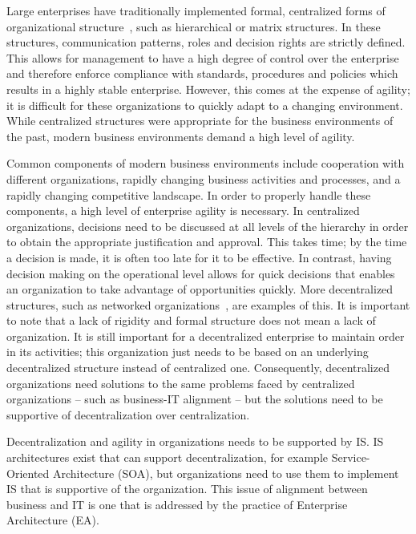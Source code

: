 Large enterprises have traditionally implemented formal, centralized forms of organizational structure~\cite{pearlson2009}, such as hierarchical or matrix structures. In these structures, communication patterns, roles and decision rights are strictly defined. This allows for management to have a high degree of control over the enterprise and therefore enforce compliance with standards, procedures and policies which results in a highly stable enterprise. However, this comes at the expense of agility; it is difficult for these organizations to quickly adapt to a changing environment. While centralized structures were appropriate for the business environments of the past, modern business environments demand a high level of agility.

Common components of modern business environments include cooperation with different organizations,  rapidly changing business activities and processes, and a rapidly changing competitive landscape. In order to properly handle these components, a high level of enterprise agility is necessary. In centralized organizations, decisions need to be discussed at all levels of the hierarchy in order to obtain the appropriate justification and approval. This takes time; by the time a decision is made, it is often too late for it to be effective. In contrast, having decision making on the operational level allows for quick decisions that enables an organization to take advantage of opportunities quickly. More decentralized structures, such as networked organizations~\cite{pearlson2009}, are examples of this. It is important to note that a lack of rigidity and formal structure does not mean a lack of organization. It is still important for a decentralized enterprise to maintain order in its activities; this organization just needs to be based on an underlying decentralized structure instead of centralized one. Consequently, decentralized organizations need solutions to the same problems faced by centralized organizations -- such as business-IT alignment -- but the solutions need to be supportive of decentralization over centralization. 

Decentralization and agility in organizations needs to be supported by IS. IS architectures exist that can support decentralization, for example Service-Oriented Architecture (SOA), but organizations need to use them to implement IS that is supportive of the organization. This issue of alignment between business and IT is one that is addressed by the practice of Enterprise Architecture (EA). 

